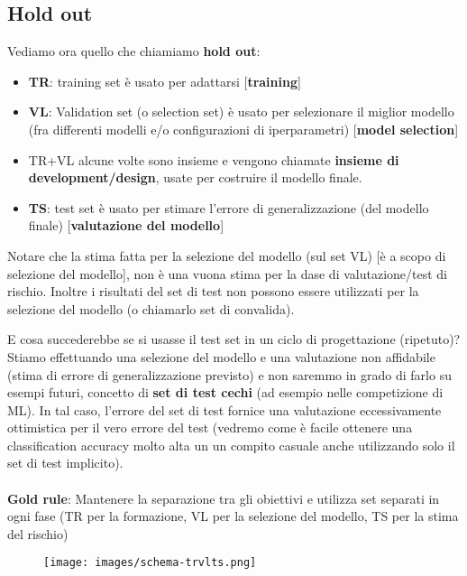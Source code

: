 \subsection{Hold out}
Vediamo ora quello che chiamiamo \textbf{hold out}:
\begin{itemize}
    \item \textbf{TR}: training set è usato per adattarsi [\textbf{training}]
    \item \textbf{VL}: Validation set (o selection set) è usato per selezionare il miglior modello (fra differenti modelli e/o configurazioni di iperparametri) [\textbf{model selection}]
    \item TR+VL alcune volte sono insieme e vengono chiamate \textbf{insieme di development/design}, usate per costruire il modello finale.
    \item \textbf{TS}: test set è usato per stimare l'errore di generalizzazione (del modello finale) [\textbf{valutazione del modello}] 
\end{itemize}
\begin{note}
    Notare che la stima fatta per la selezione del modello (sul set VL) [è a scopo di selezione del modello], non è una vuona stima per la dase di valutazione/test di rischio. Inoltre
    i risultati del set di test non possono essere utilizzati per la selezione del modello (o chiamarlo set di convalida).
\end{note}
E cosa succederebbe se si usasse il test set in un ciclo di progettazione (ripetuto)?\\
Stiamo effettuando una selezione del modello e una valutazione non affidabile (stima di errore di generalizzazione previsto) e non saremmo in grado di farlo su esempi futuri, concetto di \textbf{set di test cechi} (ad esempio nelle competizione di ML).
In tal caso, l'errore del set di test fornice una valutazione eccessivamente ottimistica per il vero errore del test (vedremo come è facile ottenere una classification accuracy molto alta un un compito casuale anche utilizzando solo il set di test implicito). \\\\
\textbf{Gold rule}: Mantenere la separazione tra gli obiettivi e utilizza set separati in ogni fase (TR per la formazione, VL per la selezione del modello, TS per la stima del rischio)
\begin{figure}[h!]
    \centering
    \texttt{[image: images/schema-trvlts.png]}
\end{figure}
\newpage
